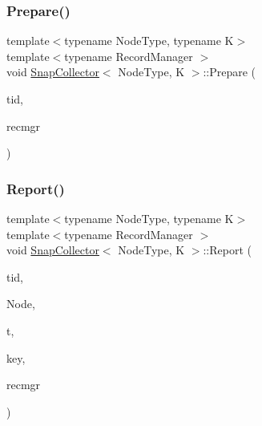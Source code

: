 \mbox{\label{classSnapCollector_a8c2b96dd6ec25eb4abfdc0c1ba2abc29}} 
\subsubsection{\texorpdfstring{Prepare()}{Prepare()}}
{\footnotesize\ttfamily template$<$typename Node\+Type, typename K$>$ \\
template$<$typename Record\+Manager $>$ \\
void \hyperlink{classSnapCollector}{Snap\+Collector}$<$ Node\+Type, K $>$\+::Prepare (\begin{DoxyParamCaption}\item[{int}]{tid,  }\item[{Record\+Manager $\ast$}]{recmgr }\end{DoxyParamCaption})\hspace{0.3cm}{\ttfamily [inline]}}

\mbox{\label{classSnapCollector_a99bf72a5b736cc82ce4c64e0fd76d15e}} 
\subsubsection{\texorpdfstring{Report()}{Report()}}
{\footnotesize\ttfamily template$<$typename Node\+Type, typename K$>$ \\
template$<$typename Record\+Manager $>$ \\
void \hyperlink{classSnapCollector}{Snap\+Collector}$<$ Node\+Type, K $>$\+::Report (\begin{DoxyParamCaption}\item[{int}]{tid,  }\item[{Node\+Type $\ast$}]{Node,  }\item[{\hyperlink{reportitem_8h_ae4f179a72db5cca021a37ec4c6fe4c68}{Report\+Type}}]{t,  }\item[{K}]{key,  }\item[{Record\+Manager $\ast$}]{recmgr }\end{DoxyParamCaption})\hspace{0.3cm}{\ttfamily [inline]}}

\mbox{\label{classSnapCollector_a9060f1d38be8915ad5e0139bc518bab4}} 
